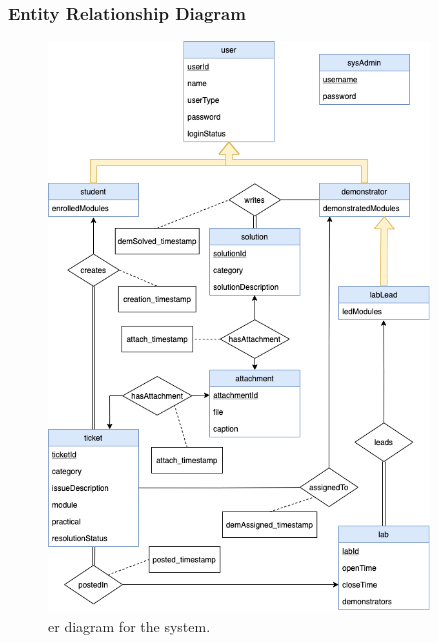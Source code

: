 \subsubsection{Entity Relationship Diagram}

\begin{figure}[H]
    \centering
    \includegraphics[width=0.9\textwidth]{7design/images/ER.png}
    \caption{\gls{er} diagram for the system.}
    \label{fig:ER}
\end{figure}
